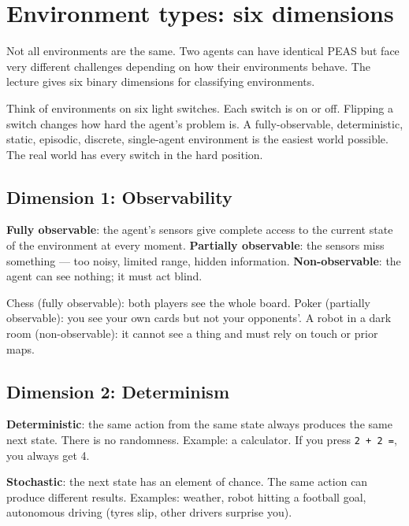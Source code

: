 \documentclass[a4paper,11pt]{article}
\newcommand{\vocab}[1]{\textbf{\color{navy}#1}}
\begin{document}
\section{Environment types: six dimensions}

Not all environments are the same. Two agents can have identical PEAS but face
very different challenges depending on how their environments behave. The lecture
gives six binary dimensions for classifying environments.

\begin{intuition}
Think of environments on six light switches. Each switch is on or off.
Flipping a switch changes how hard the agent's problem is.
A fully-observable, deterministic, static, episodic, discrete, single-agent
environment is the easiest world possible.
The real world has every switch in the hard position.
\end{intuition}

\subsection{Dimension 1: Observability}

\vocab{Fully observable}: the agent's sensors give complete access to the
current state of the environment at every moment.
\vocab{Partially observable}: the sensors miss something --- too noisy, limited
range, hidden information.
\vocab{Non-observable}: the agent can see nothing; it must act blind.

\begin{everyday}
Chess (fully observable): both players see the whole board. Poker (partially
observable): you see your own cards but not your opponents'. A robot in a dark
room (non-observable): it cannot see a thing and must rely on touch or prior maps.
\end{everyday}

\subsection{Dimension 2: Determinism}

\vocab{Deterministic}: the same action from the same state always produces the
same next state. There is no randomness. Example: a calculator. If you press
\texttt{2 + 2 =}, you always get 4.

\vocab{Stochastic}: the next state has an element of chance. The same action
can produce different results. Examples: weather, robot hitting a football goal,
autonomous driving (tyres slip, other drivers surprise you).
\end{document}
